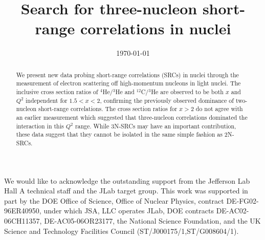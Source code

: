 \documentclass[aps,prl,superscriptaddress,showpacs,twocolumn,floatfix,amsmath,amssymb]{revtex4-1}
\begin{document}
\title{Search for three-nucleon short-range correlations in nuclei}



\date{\today}

\begin{abstract}

We present new data probing short-range correlations (SRCs) in nuclei through the measurement of electron scattering off high-momentum nucleons in
light nuclei. The inclusive cross section ratios of $^4$He/$^3$He and $^{12}$C/$^3$He are observed to be both $x$ and $Q^2$ independent
for $1.5 < x <2$, confirming the previously observed dominance of two-nucleon short-range correlations. The cross section ratios for
$x > 2$ do not agree with an earlier measurement which suggested that three-nucleon correlations dominated the interaction in this $Q^2$ range.
While 3N-SRCs may have an important contribution, these data suggest that they cannot be isolated in the same simple fashion as 2N-SRCs.

\end{abstract}

\maketitle









\begin{acknowledgments}

We would like to acknowledge the outstanding support from the Jefferson Lab Hall A technical staff and the
JLab target group. This work was supported in part by the DOE Office of Science, Office of Nuclear Physics,
contract DE-FG02-96ER40950, under which JSA, LLC operates JLab, DOE contracts DE-AC02-06CH11357,
DE-AC05-06OR23177, the National Science Foundation, and the UK Science and Technology Facilities Council
(ST/J000175/1,ST/G008604/1).

\end{acknowledgments}

%


\end{document}
